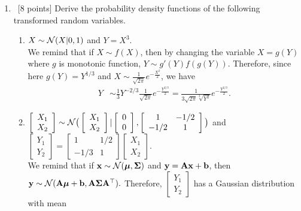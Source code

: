 \documentclass[12pt, fullpage,letterpaper]{article}
\def\blackblue{\color{black!40!blue}}
\begin{document}
\begin{enumerate}
\item~[8 points] Derive the probability density functions of the following transformed random variables. 
\begin{enumerate}
	\item $X \sim \mathcal{N}(X|0, 1)$ and $Y = X^3$.\\
	{\blackblue\noindent 
	We remind that if $X \sim f(X)$, then by changing the variable $X = g(Y)$ where $g$ is monotonic function,  $Y\sim g'(Y) f(g(Y))$.
	Therefore, since here $g(Y) = Y^{1/3}$ and $X\sim \frac{1}{\sqrt{2\pi}}e^{-\frac{X^2}{2}}$, we have 
	\begin{align*}
	Y & \sim \frac{1}{3}Y^{-2/3}\frac{1}{\sqrt{2\pi}}e^{-\frac{Y^{2/3}}{2}} = \frac{1}{3\sqrt{2\pi}\sqrt[3]{Y^2}}e^{-\frac{Y^{2/3}}{2}}.
	\end{align*}
	}
	\item $\left[\begin{array}{c}X_1 \\ X_2\end{array}\right] \sim \mathcal{N}\big(\left[\begin{array}{c}X_1 \\ X_2\end{array}\right]|\left[\begin{array}{c}0 \\ 0 \end{array}\right], \left[\begin{array}{cc}1 & -1/2 \\ -1/2 & 1\end{array}\right]\big)$ and $\left[\begin{array}{c}Y_1 \\ Y_2\end{array}\right] = \left[\begin{array}{cc}1 & 1/2\\-1/3&1\end{array}\right]\left[\begin{array}{c}X_1 \\ X_2\end{array}\right]$.\\
	{\blackblue\noindent 
	We remind that if ${\bf x}\sim \mathcal{N}(\boldsymbol{\mu},\boldsymbol{\Sigma})$ and ${\bf y} = {\bf A}{\bf x} +{\bf b}$, then ${\bf y}\sim \mathcal{N}({\bf A}\boldsymbol{\mu} +{\bf b}, {\bf A}\boldsymbol{\Sigma}{\bf A}^\top).$
	Therefore, $\left[\begin{array}{c}Y_1 \\ Y_2\end{array}\right]$ has a Gaussian distribution with mean
}
\end{enumerate}
\end{enumerate}
\end{document}
